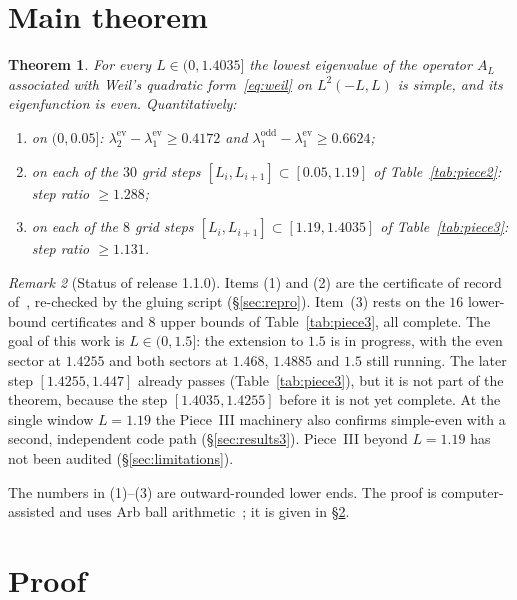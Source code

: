 \documentclass[11pt]{amsart}
\newcommand{\Lmax}{1.4035}                                %
\newcommand{\ev}{\mathrm{ev}}
\newcommand{\od}{\mathrm{odd}}
\newtheorem{theorem}{Theorem}[section]
\theoremstyle{definition}
\theoremstyle{remark}
\newtheorem{remark}[theorem]{Remark}
\numberwithin{equation}{section}
\begin{document}
\section{Main theorem}\label{sec:main}

\begin{theorem}\label{thm:main}
For every $L\in(0,\Lmax]$ the lowest eigenvalue of the operator $A_L$ associated with Weil's quadratic form~\eqref{eq:weil} on $L^2(-L,L)$ is simple, and its eigenfunction is even. Quantitatively:
\begin{enumerate}
\item on $(0,0.05]$: $\lambda_2^\ev-\lambda_1^\ev\ge0.4172$ and $\lambda_1^\od-\lambda_1^\ev\ge0.6624$;
\item on each of the $30$ grid steps $[L_i,L_{i+1}]\subset[0.05,1.19]$ of Table~\ref{tab:piece2}: step ratio $\ge1.288$;
\item on each of the $8$ grid steps $[L_i,L_{i+1}]\subset[1.19,\Lmax]$ of Table~\ref{tab:piece3}: step ratio $\ge1.131$.
\end{enumerate}
\end{theorem}

\begin{remark}[Status of release 1.1.0]\label{rem:status}
Items (1) and (2) are the certificate of record of~\cite{Botha}, re-checked by the gluing script (\S\ref{sec:repro}). Item~(3) rests on the $16$ lower-bound certificates and $8$ upper bounds of Table~\ref{tab:piece3}, all complete. The goal of this work is $L\in(0,1.5]$: the extension to $1.5$ is in progress, with the even sector at $1.4255$ and both sectors at $1.468$, $1.4885$ and $1.5$ still running. The later step $[1.4255,1.447]$ already passes (Table~\ref{tab:piece3}), but it is not part of the theorem, because the step $[1.4035,1.4255]$ before it is not yet complete. At the single window $L=1.19$ the Piece~III machinery also confirms simple-even with a second, independent code path (\S\ref{sec:results3}). Piece~III beyond $L=1.19$ has not been audited (\S\ref{sec:limitations}).
\end{remark}

The numbers in (1)--(3) are outward-rounded lower ends. The proof is computer-assisted and uses Arb ball arithmetic~\cite{Johansson,FLINT}; it is given in \S\ref{sec:proof}.

\section{Proof}\label{sec:proof}
\end{document}

